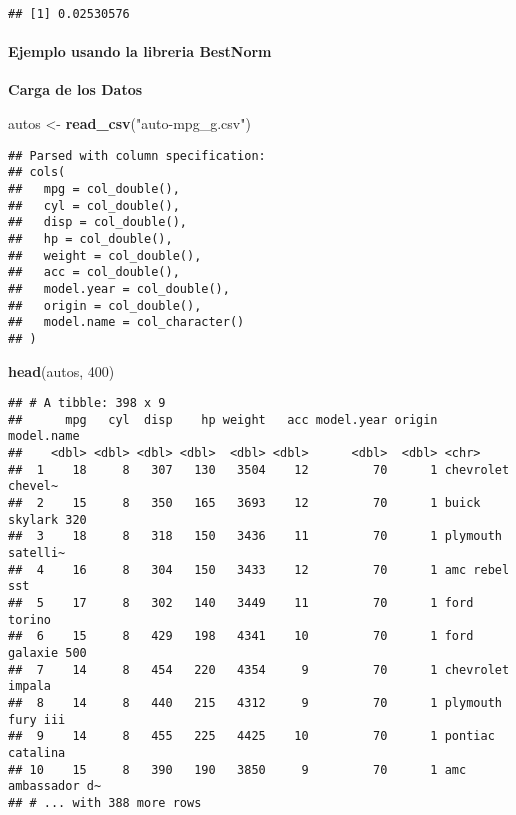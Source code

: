 \documentclass[]{article}
\newenvironment{Shaded}{\begin{snugshade}}{\end{snugshade}}
\newcommand{\DecValTok}[1]{\textcolor[rgb]{0.00,0.00,0.81}{#1}}
\newcommand{\KeywordTok}[1]{\textcolor[rgb]{0.13,0.29,0.53}{\textbf{#1}}}
\newcommand{\NormalTok}[1]{#1}
\newcommand{\StringTok}[1]{\textcolor[rgb]{0.31,0.60,0.02}{#1}}
\let\oldparagraph\paragraph
\renewcommand{\paragraph}[1]{\oldparagraph{#1}\mbox{}}
\begin{document}
\begin{verbatim}
## [1] 0.02530576
\end{verbatim}

\hypertarget{ejemplo-usando-la-libreria-bestnorm}{%
\paragraph{\texorpdfstring{\textbf{Ejemplo usando la libreria
BestNorm}}{Ejemplo usando la libreria BestNorm}}\label{ejemplo-usando-la-libreria-bestnorm}}

\textbf{Carga de los Datos}

\begin{Shaded}
\begin{Highlighting}[]
\NormalTok{autos <-}\StringTok{ }\KeywordTok{read_csv}\NormalTok{(}\StringTok{"auto-mpg_g.csv"}\NormalTok{)}
\end{Highlighting}
\end{Shaded}

\begin{verbatim}
## Parsed with column specification:
## cols(
##   mpg = col_double(),
##   cyl = col_double(),
##   disp = col_double(),
##   hp = col_double(),
##   weight = col_double(),
##   acc = col_double(),
##   model.year = col_double(),
##   origin = col_double(),
##   model.name = col_character()
## )
\end{verbatim}

\begin{Shaded}
\begin{Highlighting}[]
\KeywordTok{head}\NormalTok{(autos, }\DecValTok{400}\NormalTok{)}
\end{Highlighting}
\end{Shaded}

\begin{verbatim}
## # A tibble: 398 x 9
##      mpg   cyl  disp    hp weight   acc model.year origin model.name       
##    <dbl> <dbl> <dbl> <dbl>  <dbl> <dbl>      <dbl>  <dbl> <chr>            
##  1    18     8   307   130   3504    12         70      1 chevrolet chevel~
##  2    15     8   350   165   3693    12         70      1 buick skylark 320
##  3    18     8   318   150   3436    11         70      1 plymouth satelli~
##  4    16     8   304   150   3433    12         70      1 amc rebel sst    
##  5    17     8   302   140   3449    11         70      1 ford torino      
##  6    15     8   429   198   4341    10         70      1 ford galaxie 500 
##  7    14     8   454   220   4354     9         70      1 chevrolet impala 
##  8    14     8   440   215   4312     9         70      1 plymouth fury iii
##  9    14     8   455   225   4425    10         70      1 pontiac catalina 
## 10    15     8   390   190   3850     9         70      1 amc ambassador d~
## # ... with 388 more rows
\end{verbatim}
\end{document}
